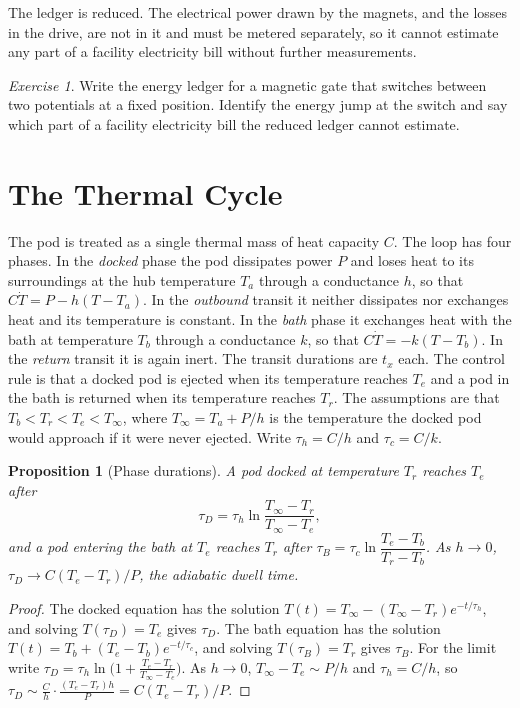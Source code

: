 \documentclass[11pt,openany]{book}
\theoremstyle{plain}
\newtheorem{proposition}[theorem]{Proposition}
\theoremstyle{definition}
\theoremstyle{remark}
\newtheorem{exercise}[theorem]{Exercise}
\begin{document}
The ledger is reduced. The electrical power drawn by the magnets, and the losses in the drive, are not in it and must be metered separately, so it cannot estimate any part of a facility electricity bill without further measurements.

\begin{exercise}
Write the energy ledger for a magnetic gate that switches between two potentials at a fixed position. Identify the energy jump at the switch and say which part of a facility electricity bill the reduced ledger cannot estimate.
\end{exercise}

\section{The Thermal Cycle}

The pod is treated as a single thermal mass of heat capacity $C$. The loop has four phases. In the \emph{docked} phase the pod dissipates power $P$ and loses heat to its surroundings at the hub temperature $T_a$ through a conductance $h$, so that $C\dot T=P-h(T-T_a)$. In the \emph{outbound} transit it neither dissipates nor exchanges heat and its temperature is constant. In the \emph{bath} phase it exchanges heat with the bath at temperature $T_b$ through a conductance $k$, so that $C\dot T=-k(T-T_b)$. In the \emph{return} transit it is again inert. The transit durations are $t_x$ each. The control rule is that a docked pod is ejected when its temperature reaches $T_e$ and a pod in the bath is returned when its temperature reaches $T_r$. The assumptions are that $T_b<T_r<T_e<T_\infty$, where $T_\infty=T_a+P/h$ is the temperature the docked pod would approach if it were never ejected. Write $\tau_h=C/h$ and $\tau_c=C/k$.

\begin{proposition}[Phase durations]
\label{prop:phases}
A pod docked at temperature $T_r$ reaches $T_e$ after
\[
\tau_D=\tau_h\ln\frac{T_\infty-T_r}{T_\infty-T_e},
\]
and a pod entering the bath at $T_e$ reaches $T_r$ after $\tau_B=\tau_c\ln\dfrac{T_e-T_b}{T_r-T_b}$. As $h\to0$, $\tau_D\to C(T_e-T_r)/P$, the adiabatic dwell time.
\end{proposition}
\begin{proof}
The docked equation has the solution $T(t)=T_\infty-(T_\infty-T_r)e^{-t/\tau_h}$, and solving $T(\tau_D)=T_e$ gives $\tau_D$. The bath equation has the solution $T(t)=T_b+(T_e-T_b)e^{-t/\tau_c}$, and solving $T(\tau_B)=T_r$ gives $\tau_B$. For the limit write $\tau_D=\tau_h\ln\bigl(1+\tfrac{T_e-T_r}{T_\infty-T_e}\bigr)$. As $h\to0$, $T_\infty-T_e\sim P/h$ and $\tau_h=C/h$, so $\tau_D\sim\tfrac Ch\cdot\tfrac{(T_e-T_r)h}{P}=C(T_e-T_r)/P$.
\end{proof}
\end{document}
